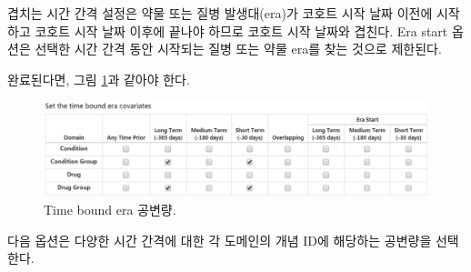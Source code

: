 \documentclass[11pt]{book}
\theoremstyle{definition}
\theoremstyle{definition}
\theoremstyle{definition}
\theoremstyle{remark}
\begin{document}
겹치는 시간 간격 설정은 약물 또는 질병 발생대(era)가 코호트 시작 날짜
이전에 시작하고 코호트 시작 날짜 이후에 끝나야 하므로 코호트 시작 날짜와
겹친다. Era start 옵션은 선택한 시간 간격 동안 시작되는 질병 또는 약물
era를 찾는 것으로 제한된다.

완료된다면, 그림 \ref{fig:covariateSettings4}과 같아야 한다.

\begin{figure}

{\centering \includegraphics[width=1\linewidth]{images/PatientLevelPrediction/covariateSettings4} 

}

\caption{Time bound era 공변량.}\label{fig:covariateSettings4}
\end{figure}

다음 옵션은 다양한 시간 간격에 대한 각 도메인의 개념 ID에 해당하는
공변량을 선택한다.
\end{document}
